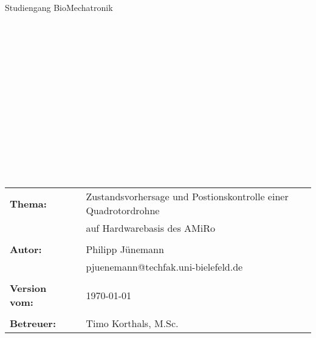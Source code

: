 \begin{center}
\Large{Studiengang BioMechatronik}
\end{center}
\begin{verbatim}




\end{verbatim}
\begin{center}
\doublespacing
\textbf{\LARGE{\titleDocument}}\\
\singlespacing
\begin{verbatim}

\end{verbatim}
\textbf{{~\subjectDocument}}
\end{center}
\begin{verbatim}

\end{verbatim}
\begin{center}

\end{center}
\begin{verbatim}

\end{verbatim}
\begin{center}
\end{center}
\begin{verbatim}






\end{verbatim}
\begin{flushleft}
\begin{tabular}{llll}
\textbf{Thema:} & & Zustandsvorhersage und Postionskontrolle einer Quadrotordrohne & \\
& & auf Hardwarebasis des AMiRo & \\
& & \\
\textbf{Autor:} & & Philipp Jünemann& \\
& & pjuenemann@techfak.uni-bielefeld.de & \\
& & \\
\textbf{Version vom:} & & \today &\\
& & \\
\textbf{Betreuer:} & & Timo Korthals, M.Sc. &\\
\end{tabular}
\end{flushleft}